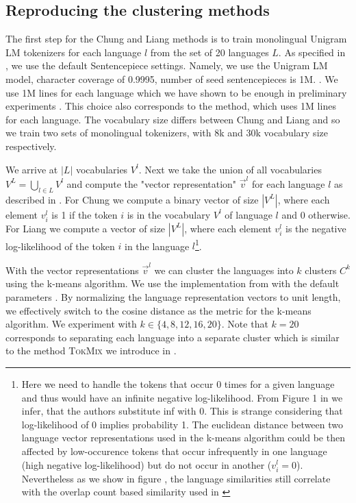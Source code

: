 \subsection{Reproducing the clustering methods}

The first step for the Chung and Liang methods is to train monolingual Unigram LM tokenizers for each language $l$ from the set of 20 languages $L$. As specified in \citet{chung_improving_2020}, we use the default Sentencepiece settings. Namely, we use the Unigram LM model, character coverage of 0.9995, number of seed sentencepieces is 1M. . We use 1M lines for each language which we have shown to be enough in preliminary experiments . This choice also corresponds to the \citet{zheng_allocating_2021} method, which uses 1M lines for each language. The vocabulary size differs between Chung and Liang and so we train two sets of monolingual tokenizers, with 8k and 30k vocabulary size respectively.

We arrive at $|L|$ vocabularies $V^l$. Next we take the union of all vocabularies $V^L = \bigcup_{l \in L} V^l$ and compute the "vector representation" $\vec{v}^l$ for each language $l$ as described in . For Chung we compute a binary vector of size $|V^L|$, where each element $v^l_i$ is 1 if the token $i$ is in the vocabulary $V^l$ of language $l$ and 0 otherwise. For Liang we compute a vector of size $|V^L|$, where each element $v^l_i$ is the negative log-likelihood of the token $i$ in the language $l$\footnote{Here we need to handle the tokens that occur 0 times for a given language and thus would have an infinite negative log-likelihood. From Figure 1 in \cite{liang_xlm-v_2023} we infer, that the authors substitute inf with 0. This is strange considering that log-likelihood of 0 implies probability 1. The euclidean distance between two language vector representations used in the k-means algorithm could be then affected by low-occurence tokens that occur infrequently in one language (high negative log-likelihood) but do not occur in another ($v^l_i = 0$). Nevertheless as we show in figure , the language similarities still correlate with the overlap count based similarity used in \cite{chung_improving_2020}}.

With the vector representations $\vec{v}^l$ we can cluster the languages into $k$ clusters $C^k$ using the k-means algorithm. We use the implementation from \cite{scikit-learn} with the default parameters . By normalizing the language representation vectors to unit length, we effectively switch to the cosine distance as the metric for the k-means algorithm. We experiment with $k \in \{4, 8, 12, 16, 20\}$. Note that $k=20$ corresponds to separating each language into a separate cluster which is similar to the method \textsc{TokMix} we introduce in \citet{limisiewicz_tokenization_2023}. 

